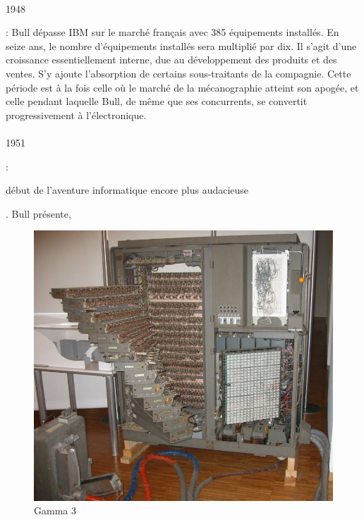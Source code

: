 \documentclass[11pt]{article}
\begin{document}
		\paragraph{}
		\begin{bf}1948\end{bf}: Bull dépasse IBM sur le marché français avec 385 équipements installés. En seize ans, 
		le nombre d’équipements installés sera multiplié par dix. Il s'agit d'une croissance essentiellement interne, due au 
		développement des produits et des ventes. S'y ajoute l'absorption de certains sous-traitants de la compagnie. Cette 
		période est à la fois celle où le marché de la mécanographie atteint son apogée, et celle pendant laquelle Bull, de 
		même que ses concurrents, se convertit progressivement à l'électronique.
		\newline{}
		\paragraph{}
		\begin{bf}1951\end{bf}: \begin{bf}début de l’aventure informatique encore plus audacieuse\end{bf}. Bull présente, 
		\begin{figure}
		\includegraphics[scale=0.15]{gamma3.jpg}
		\caption{Gamma 3}
		\end{figure}
\end{document}
